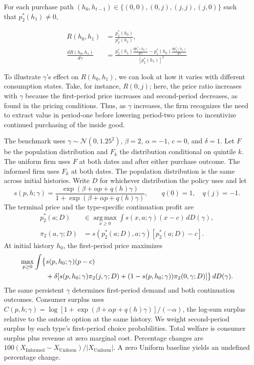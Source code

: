 \documentclass[12pt]{article}
\theoremstyle{definition}
\theoremstyle{remark}
\newcommand{\argmax}{\operatorname*{arg\,max}}
\begin{document}
For each purchase path $(h_0,h_{t-1})\in\{(0,0),(0,j),(j,j),(j,0)\}$ such that $p_2^*(h_1)\ne0$,

\begin{align}
 R(h_0,h_1)&=\frac{p_1^*(h_0)}{p_2^*(h_1)},\\
 \frac{dR(h_0,h_1)}{d\gamma} &=\frac{p_2^*(h_1)\frac{dp_1^*(h_0)}{d\gamma}-p_1^*(h_0)\frac{dp_2^*(h_1)}{d\gamma}}{[p_2^*(h_1)]^2}
\end{align}

To illustrate $\gamma$'s effect on $R(h_0, h_1)$, we can look at how it varies with different consumption states. Take, for instance, $R(0,j)$; here, the price ratio increases with $\gamma$ because the first-period price increases and second-period decreases, as found in the pricing conditions. Thus, as $\gamma$ increases, the firm recognizes the need to extract value in period-one before lowering period-two prices to incentivize continued purchasing of the inside good. 

\label{subsec:gamma-uncertainty}
The benchmark uses $\gamma\sim\mathcal N(0,1.25^2)$, $\beta=2$, $\alpha=-1$,
$c=0$, and $\delta=1$. Let $F$ be the population distribution and $F_k$
the distribution conditional on quintile $k$. The uniform firm uses $F$ at
both dates and after either purchase outcome. The informed firm uses $F_k$
at both dates. The population distribution is the same across initial histories.
Write $D$ for whichever distribution the policy uses and let
\begin{equation}
 s(p,h;\gamma)=
 \frac{\exp(\beta+\alpha p+q(h)\gamma)}
 {1+\exp(\beta+\alpha p+q(h)\gamma)},\qquad q(0)=1,\quad q(j)=-1.
\end{equation}
The terminal price and the type-specific continuation profit are
\begin{align}
 p_2^*(a;D)&\in\argmax_{x\geq 0}\int s(x,a;\gamma)(x-c)\,dD(\gamma),\\
 \pi_2(a,\gamma;D)&=s(p_2^*(a;D),a;\gamma)[p_2^*(a;D)-c].
\end{align}
At initial history $h_0$, the first-period price maximizes
\begin{align}
 \max_{p\geq0}\int\bigl\{
 &s(p,h_0;\gamma)(p-c)\notag\\
 &+\delta[s(p,h_0;\gamma)\pi_2(j,\gamma;D)
 +(1-s(p,h_0;\gamma))\pi_2(0,\gamma;D)]\bigr\}\,dD(\gamma).
\end{align}
The same persistent $\gamma$ determines first-period demand and both
continuation outcomes. Consumer surplus uses
$C(p,h;\gamma)=\log[1+\exp(\beta+\alpha p+q(h)\gamma)]/(-\alpha)$,
the log-sum surplus relative to the outside option at the same history.
We weight second-period surplus by each type's first-period choice
probabilities. Total welfare is consumer surplus plus revenue at zero
marginal cost. Percentage changes are
$100(X_{\mathrm{Informed}}-X_{\mathrm{Uniform}})/|X_{\mathrm{Uniform}}|$.
A zero Uniform baseline yields an undefined percentage change.
\end{document}
